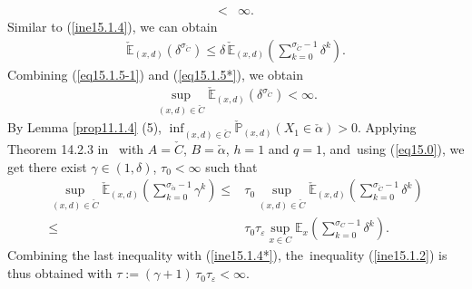 \documentclass[11pt]{elsarticle}
\def\leq{\leqslant}
\def\P{\mathbb{P}}
\def\E{\mathbb{E}}
\begin{document}
\begin{pf}
\begin{enumerate}
\begin{align}
			<&\infty\label{eq15.1.5*}.
		\end{align}
		Similar to (\ref{ine15.1.4}), we can obtain
		\begin{align}\label{eq15.1.5-1}
			\check{\E}_{(x,d)}(\delta^{\sigma_{\check{C}}})\leq\delta\,\check{\E}_{(x,d)}\left(\sum_{k=0}^{\sigma_{\check{C}}-1}\delta^{k}\right).
		\end{align}
		Combining (\ref{eq15.1.5-1}) and (\ref{eq15.1.5*}), we obtain
		\begin{align*}
			\sup_{(x,d)\in\check{C}}\check{\E}_{(x,d)}\left(\delta^{\sigma_{\check{C}}}\right)<\infty.
		\end{align*}
		By Lemma \ref{prop11.1.4} (5), $\inf_{(x,d)\in\check{C}}\check{\P}_{(x,d)}(X_1\in\check{\alpha})>0$. Applying Theorem 14.2.3 in~\cite{DMPS18} with $A=\check{C}$, $B=\check{\alpha}$, $h=1$ and $q=1$, and~using (\ref{eq15.0}), we get there exist $\gamma\in(1,\delta)$, $\tau_0<\infty$ such that
		\begin{align*}
			\sup_{(x,d)\in\check{C}}\check{\E}_{(x,d)}\left(\sum_{k=0}^{\sigma_{\check{\alpha}}-1}\gamma^k\right)\leq&\tau_0\sup_{(x,d)\in\check{C}}\check{\E}_{(x,d)}\left(\sum_{k=0}^{\sigma_{\check{C}}-1}\delta^k\right)\\
			\leq&\tau_0\tau_\varepsilon\sup_{x\in C}\E_x\left(\sum_{k=0}^{\sigma_{C}-1}\delta^k\right).
		\end{align*}
		Combining the last inequality with (\ref{ine15.1.4*}), the~inequality (\ref{ine15.1.2}) is thus obtained with $\tau:=(\gamma+1)\,\tau_0\tau_\varepsilon<\infty$.
		

\end{enumerate}
\end{pf}
\end{document}

